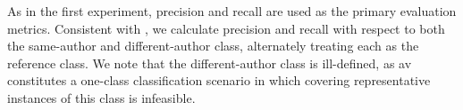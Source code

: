 As in the first experiment, precision and recall are used as the primary evaluation metrics. 
Consistent with \citet{koppel_determining_2014}, we calculate precision and recall with respect to both the same-author and different-author class, alternately treating each as the reference class.
We note that the different-author class is ill-defined, as \ac{av} constitutes a one-class classification scenario in which covering representative instances of this class is infeasible.